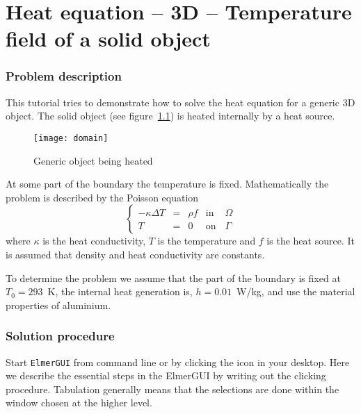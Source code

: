 \chapter{Heat equation -- 3D -- Temperature field of a solid object}



\subsection*{Problem description}

This tutorial tries to demonstrate how to solve the heat equation 
for a generic 3D object. The solid object 
(see figure~\ref{fg:object1}) is heated internally by a heat source.
\begin{figure}
\begin{center}
\texttt{[image: domain]}
\caption{Generic object being heated}\label{fg:object1}
\end{center}
\end{figure}
At some part of the boundary the temperature is fixed.
Mathematically the problem is described by the Poisson equation
\begin{equation}
\left \{
\begin{array}{ccccc}
- \kappa \Delta T &= &\rho f & \mathrm{ in } \, \, & \Omega \\
T&=&0 & \mathrm{ on } & \Gamma
\end{array}
\right .
\end{equation}
where $\kappa$ is the heat conductivity, $T$  is the temperature 
and $f$ is the heat source. It is assumed that density 
and heat conductivity are constants. 

To determine the problem we assume that the part of the boundary is fixed at $T_0=293$~K,
the internal heat generation is, $h=0.01$~W/kg, and use the material properties of aluminium.


\subsection*{Solution procedure}

Start \texttt{ElmerGUI} from command line or by clicking the icon in your desktop. Here we describe 
the essential steps in the ElmerGUI by writing out the clicking procedure. Tabulation generally means that the 
selections are done within the window chosen at the higher level. 

